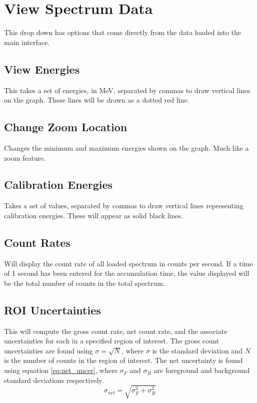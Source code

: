 \section{View Spectrum Data}
	This drop down has options that come directly from the data loaded into the main interface. 

		\subsection{View Energies}
			This takes a set of energies, in MeV, separated by commas to draw vertical lines on the graph. These lines will be drawn as a dotted red line.
		\subsection{Change Zoom Location}
			Changes the minimum and maximum energies shown on the graph. Much like a zoom feature. 
		\subsection{Calibration Energies}
			Takes a set of values, separated by commas to draw vertical lines representing calibration energies. These will appear as solid black lines. 
		\subsection{Count Rates}
			Will display the count rate of all loaded spectrum in counts per second. If a time of 1 second has been entered for the accumulation time, the value displayed will be the total number of counts in the total spectrum.
		\subsection{ROI Uncertainties}
		This will compute the gross count rate, net count rate, and the associate uncertainties for each in a specified region of interest. The gross count uncertainties are found using $\sigma=\sqrt{N}$, where $\sigma$ is the standard deviation and $N$ is the number of counts in the region of interest. The net uncertainty is found using equation \ref{eq:net_uncer}, where $\sigma_F$ and $\sigma_B$ are foreground and background standard deviations respectively.
		\begin{equation}
			\sigma_{net}=\sqrt{\sigma_F^2+\sigma_B^2}
			\label{eq:net_uncer}
		\end{equation}
